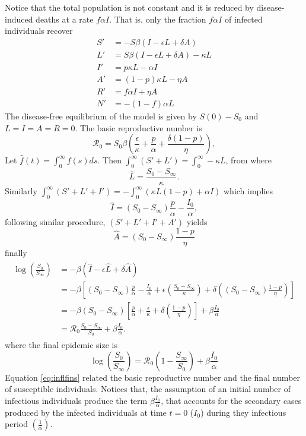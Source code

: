 \documentclass{book}
\begin{document}
Notice that the total population is not constant and it is reduced by disease-induced deaths at a rate $f\alpha I$. That is, only the fraction $f\alpha I$ of infected individuals recover
\begin{equation}
\begin{split}
S' &= -S\beta(I-\epsilon L+\delta A)\\
L' &= S\beta(I-\epsilon L+\delta A)-\kappa L\\
I' &= p\kappa L-\alpha I\\
A' &= (1-p)\kappa L-\eta A\\
R' &= f\alpha I+\eta A\\
N' &= -(1-f)\alpha L
\end{split}
\end{equation}
%
The disease-free equilibrium of the model is given by $S(0)-S_0$ and $L=I=A=R=0$.
%
The basic reproductive number is 
$$
\mathcal{R}_0=S_0\beta\left(\frac{\epsilon}{\kappa}+\frac{p}{\alpha}+\frac{\delta(1-p)}{\eta} \right),
$$
%
Let $\hat{f}(t)=\int_0^\infty f(s) ds$. Then $\int_{0}^\infty (S'+L')=\int_{0}^\infty-\kappa L$, from where 
$$
\hat{L}=\frac{S_0-S_\infty}{\kappa}.
$$ 
Similarly $\int_{0}^\infty (S'+L'+I')= -\int_{0}^\infty (\kappa L(1-p)+\alpha I)$ which implies 
$$
\hat{I}=(S_0-S_\infty)\frac{p}{\alpha}-\frac{I_0}{\alpha},
$$
following similar procedure, $(S'+L'+I'+A')$ yields
$$
\hat{A}=(S_0-S_\infty)\frac{1-p}{\eta}
$$
finally
%
\begin{align*}
\begin{split}
\log\left(\frac{S_0}{S_\infty}\right) &=-\beta \left( \hat{I}-\epsilon \hat{L}+\delta \hat{A} \right)\\
&= -\beta\left[ (S_0-S_\infty)\frac{p}{\alpha}-\frac{I_0}{\alpha} +\epsilon \left( \frac{S_0-S_\infty}{\kappa} \right) +\delta\left( (S_0-S_\infty)\frac{1-p}{\eta} \right) \right]\\
&= -\beta(S_0-S_\infty)\left[  \frac{p}{\alpha} +  \frac{\epsilon}{\kappa} +\delta\left( \frac{1-p}{\eta} \right)  \right]+\beta\frac{I_0}{\alpha}\\
&= \mathcal{R}_0\frac{S_0-S_\infty}{S_0}+\beta\frac{I_0}{\alpha}.
\end{split}
\end{align*}
%
where the final epidemic size is
\begin{equation} \label{eq:inflfins}
    \log\left(\frac{S_0}{S_\infty}\right) = \mathcal{R}_0\left(1-\frac{S_\infty}{S_0}\right)+\beta\frac{I_0}{\alpha}
\end{equation}
%
Equation \eqref{eq:inflfins} related the basic reproductive number and the final number of susceptible individuals. Notices that, the assumption of an initial number of infectious individuals produce the term $\beta\frac{I_0}{\alpha}$, that accounts for the secondary cases produced by the infected individuals at time $t=0$ ($I_0$) during they infectious period $\left(\frac{1}{\alpha}\right)$.
\end{document}
